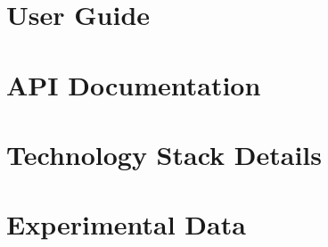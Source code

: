 \documentclass[12pt,a4paper]{book}
\begin{document}


\appendix
\chapter{User Guide}
\label{appendix:user-guide}


\chapter{API Documentation}
\label{appendix:api-documentation}


\chapter{Technology Stack Details}
\label{appendix:technology-stack}


\chapter{Experimental Data}
\label{appendix:experimental-data}




\end{document}
